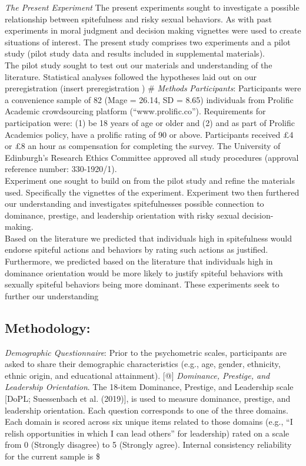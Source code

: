 \documentclass[
  english,
  a4paper]{apa7}
\begin{document}
\emph{The Present Experiment}
The present experiments sought to investigate a possible relationship between spitefulness and risky sexual behaviors. As with past experiments in moral judgment and decision making vignettes were used to create situations of interest. The present study comprises two experiments and a pilot study (pilot study data and results included in supplemental materials).\\
The pilot study sought to test out our materials and understanding of the literature. Statistical analyses followed the hypotheses laid out on our preregistration (insert preregistration
)
\# \emph{Methods}
\emph{Participants}: Participants were a convenience sample of 82 (Mage = 26.14, SD = 8.65) individuals from Prolific Academic crowdsourcing platform (``www.prolific.co''). Requirements for participation were: (1) be 18 years of age or older and (2) and as part of Prolific Academics policy, have a prolific rating of 90 or above. Participants received £4 or £8 an hour as compensation for completing the survey. The University of Edinburgh's Research Ethics Committee approved all study procedures (approval reference number: 330-1920/1).\\
Experiment one sought to build on from the pilot study and refine the materials used. Specifically the vignettes of the experiment. Experiment two then furthered our understanding and investigates spitefulnesses possible connection to dominance, prestige, and leadership orientation with risky sexual decision-making.\\
Based on the literature we predicted that individuals high in spitefulness would endorse spiteful actions and behaviors by rating such actions as justified. Furthermore, we predicted based on the literature that individuals high in dominance orientation would be more likely to justify spiteful behaviors with sexually spiteful behaviors being more dominant. These experiments seek to further our understanding

\hypertarget{methodology}{%
\subsection{Methodology:}\label{methodology}}

\emph{Demographic Questionnaire}:
Prior to the psychometric scales, participants are asked to share their demographic characteristics (e.g., age, gender, ethnicity, ethnic origin, and educational attainment).
{[}@{]}
\emph{Dominance, Prestige, and Leadership Orientation}.
The 18-item Dominance, Prestige, and Leadership scale {[}DoPL; Suessenbach et al. (2019){]}, is used to measure dominance, prestige, and leadership orientation. Each question corresponds to one of the three domains. Each domain is scored across six unique items related to those domains (e.g., ``I relish opportunities in which I can lead others'' for leadership) rated on a scale from 0 (Strongly disagree) to 5 (Strongly agree). Internal consistency reliability for the current sample is \$
\end{document}
